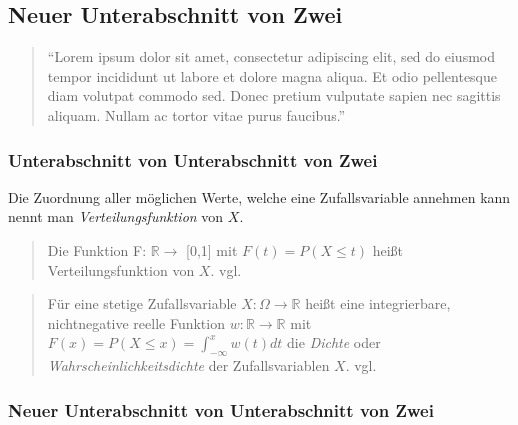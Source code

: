   
\subsection{Neuer Unterabschnitt von Zwei}\label{unterabschnitt_3}

\begin{quote}
  \singlespacing \small
  "`Lorem ipsum dolor sit amet, consectetur adipiscing elit, sed do eiusmod tempor incididunt ut labore et dolore magna aliqua. Et odio pellentesque diam volutpat commodo sed. Donec pretium vulputate sapien nec 
  sagittis aliquam. Nullam ac tortor vitae purus faucibus."'~\cite[S. 189]{KnutThea2009}
\end{quote}

\Blindtext

\subsubsection{Unterabschnitt von Unterabschnitt von Zwei}\label{unterunterabschnitt}
\Blindtext
\Blindtext
Die Zuordnung aller möglichen Werte, welche eine Zufallsvariable annehmen kann nennt man \emph{Verteilungsfunktion} von $X$.

\begin{quote}
Die Funktion F: $\mathbb{R} \rightarrow$ [0,1] mit $F(t) = P (X \le t)$ heißt Verteilungsfunktion von $X$. vgl.~\cite[S.55]{mf2005}
\end{quote}

\begin{quote}
Für eine stetige Zufallsvariable $X: \Omega \rightarrow \mathbb{R}$ heißt eine integrierbare, nichtnegative reelle Funktion 
$w: \mathbb{R} \rightarrow \mathbb{R}$ mit $F(x) = P(X \le x) = \int_{-\infty}^{x} w(t)dt$ die \emph{Dichte} oder \emph{Wahrscheinlichkeitsdichte} 
der Zufallsvariablen $X$. vgl.~\cite[S.225-323]{KnutThea2009}
\end{quote}

\Blindtext

\subsubsection{Neuer Unterabschnitt von Unterabschnitt von Zwei}\label{neuerunterunterabschnitt}

\Blindtext
